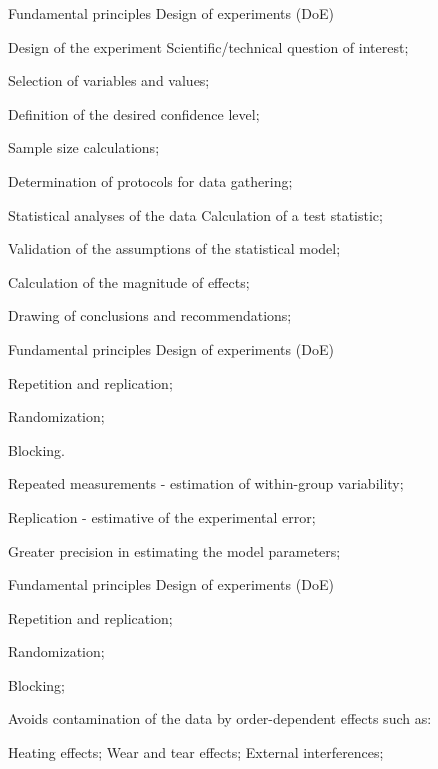 \documentclass[t]{beamer}
\begin{document}

\begin{ftst}
{Fundamental principles}
{Design of experiments (DoE)}
\begin{block}{Design of the experiment}
	\small
	\bitems Scientific/technical question of interest;
		\item Selection of variables and values;
		\item Definition of the desired confidence level;
		\item Sample size calculations;
		\item Determination of protocols for data gathering;
	\eitem
\end{block}
\begin{block}{Statistical analyses of the data}
	\small
	\bitems Calculation of a test statistic;
		\item Validation of the assumptions of the statistical model;
		\item Calculation of the magnitude of effects;
		\item Drawing of conclusions and recommendations;
	\eitem
\end{block}
\end{ftst}


\begin{ftst}
{Fundamental principles}
{Design of experiments (DoE)}
\begin{block}{}
	\bitems \alert{Repetition and replication};
		\item Randomization;
		\item Blocking.
	\eitem
\end{block}
	\bitems Repeated measurements - estimation of within-group variability;
		\item Replication - estimative of the experimental error;
		\item Greater precision in estimating the model parameters;
	\eitem
\end{ftst}


\begin{ftst}
{Fundamental principles}
{Design of experiments (DoE)}
\begin{block}{}
	\bitems Repetition and replication;
		\item \alert{Randomization};
		\item Blocking;
	\eitem
\end{block}
\bitems Avoids contamination of the data by order-dependent effects such as:

	\bitems Heating effects;
		\spitem Wear and tear effects;
		\spitem External interferences;
	\eitem
\eitem
\end{ftst}
\end{document}
